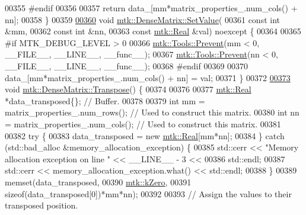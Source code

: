 \begin{DoxyCode}
00355 \textcolor{preprocessor}{  #endif}
00356 
00357   \textcolor{keywordflow}{return} data\_[mm*matrix\_properties\_.num\_cols() + nn];
00358 \}
00359 
\hypertarget{mtk__dense__matrix_8cc_source_l00360}{}\hyperlink{classmtk_1_1DenseMatrix_a784ce5784109ac86bfb9d8562b334b13}{00360} \textcolor{keywordtype}{void}  \hyperlink{classmtk_1_1DenseMatrix_a784ce5784109ac86bfb9d8562b334b13}{mtk::DenseMatrix::SetValue}(
00361     \textcolor{keyword}{const} \textcolor{keywordtype}{int} &mm,
00362     \textcolor{keyword}{const} \textcolor{keywordtype}{int} &nn,
00363     \textcolor{keyword}{const} \hyperlink{group__c01-roots_gac080bbbf5cbb5502c9f00405f894857d}{mtk::Real} &val) noexcept \{
00364 
00365 \textcolor{preprocessor}{  #if MTK\_DEBUG\_LEVEL > 0}
00366   \hyperlink{classmtk_1_1Tools_a332324c6f25e66be9dff48c5987a3b9f}{mtk::Tools::Prevent}(mm < 0, \_\_FILE\_\_, \_\_LINE\_\_, \_\_func\_\_);
00367   \hyperlink{classmtk_1_1Tools_a332324c6f25e66be9dff48c5987a3b9f}{mtk::Tools::Prevent}(nn < 0, \_\_FILE\_\_, \_\_LINE\_\_, \_\_func\_\_);
00368 \textcolor{preprocessor}{  #endif}
00369 
00370   data\_[mm*matrix\_properties\_.num\_cols() + nn] = val;
00371 \}
00372 
\hypertarget{mtk__dense__matrix_8cc_source_l00373}{}\hyperlink{classmtk_1_1DenseMatrix_a71d9c07ca66e88d97d1fd5012f43138b}{00373} \textcolor{keywordtype}{void} \hyperlink{classmtk_1_1DenseMatrix_a71d9c07ca66e88d97d1fd5012f43138b}{mtk::DenseMatrix::Transpose}() \{
00374 
00376 
00377   \hyperlink{group__c01-roots_gac080bbbf5cbb5502c9f00405f894857d}{mtk::Real} *data\_transposed\{\}; \textcolor{comment}{// Buffer.}
00378 
00379   \textcolor{keywordtype}{int} mm = matrix\_properties\_.num\_rows(); \textcolor{comment}{// Used to construct this matrix.}
00380   \textcolor{keywordtype}{int} nn = matrix\_properties\_.num\_cols(); \textcolor{comment}{// Used to construct this matrix.}
00381 
00382   \textcolor{keywordflow}{try} \{
00383     data\_transposed = \textcolor{keyword}{new} \hyperlink{group__c01-roots_gac080bbbf5cbb5502c9f00405f894857d}{mtk::Real}[mm*nn];
00384   \} \textcolor{keywordflow}{catch} (std::bad\_alloc &memory\_allocation\_exception) \{
00385     std::cerr << \textcolor{stringliteral}{"Memory allocation exception on line "} << \_\_LINE\_\_ - 3 <<
00386       std::endl;
00387     std::cerr << memory\_allocation\_exception.what() << std::endl;
00388   \}
00389   memset(data\_transposed,
00390          \hyperlink{group__c01-roots_ga59a451a5fae30d59649bcda274fea271}{mtk::kZero},
00391          \textcolor{keyword}{sizeof}(data\_transposed[0])*mm*nn);
00392 
00393   \textcolor{comment}{// Assign the values to their transposed position.}

\end{DoxyCode}
